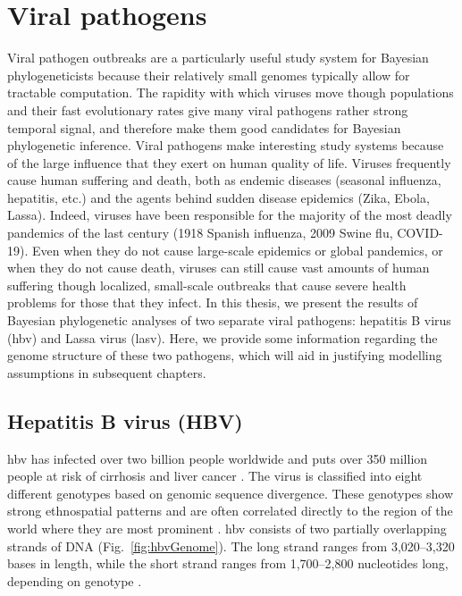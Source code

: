 \section{Viral pathogens}
Viral pathogen outbreaks are a particularly useful study system for Bayesian phylogeneticists because their relatively small genomes typically allow for tractable computation.
The rapidity with which viruses move though populations and their fast evolutionary rates give many viral pathogens rather strong temporal signal, and therefore make them good candidates for Bayesian phylogenetic inference.
Viral pathogens make interesting study systems because of the large influence that they exert on human quality of life.
Viruses frequently cause human suffering and death, both as endemic diseases (seasonal influenza, hepatitis, etc.) and the agents behind sudden disease epidemics (Zika, Ebola, Lassa).
Indeed, viruses have been responsible for the majority of the most deadly pandemics of the last century (1918 Spanish influenza, 2009 Swine flu, COVID-19).
Even when they do not cause large-scale epidemics or global pandemics, or when they do not cause death, viruses can still cause vast amounts of human suffering though localized, small-scale outbreaks that cause severe health problems for those that they infect.
In this thesis, we present the results of Bayesian phylogenetic analyses of two separate viral pathogens: hepatitis B virus (\gls{hbv}) and Lassa virus (\gls{lasv}).
Here, we provide some information regarding the genome structure of these two pathogens, which will aid in justifying modelling assumptions in subsequent chapters.


\subsection{Hepatitis B virus (HBV)}

\gls{hbv} has infected over two billion people worldwide and puts over 350 million people at risk of cirrhosis and liver cancer \cite{kane1995global}.
The virus is classified into eight different genotypes based on genomic sequence divergence.
These genotypes show strong ethnospatial patterns and are often correlated directly to the region of the world where they are most prominent \cite{schaefer2007hepatitis}.
\gls{hbv} consists of two partially overlapping strands of DNA (Fig.~\ref{fig:hbvGenome}).
The long strand ranges from 3,020--3,320 bases in length, while the short strand ranges from 1,700--2,800 nucleotides long, depending on genotype \cite{kay2007hepatitis}.

